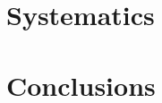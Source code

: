 \begin{refsection}
\section{Systematics}
\label{muEDM:systematics}


\cite{muEDM:Semertzidis:2001} \cite{muEDM:g-2:2008} \cite{muEDM:Adelmann:2010} \cite{muEDM:J-PARC:2011} \cite{muEDM:J-PARC:2016} \cite{muEDM:PSI:2021} \cite{muEDM:PSI:Mikio:2022} \cite{muEDM:PSI:Kim:2022}

\section{Conclusions}

\printbibliography[title=Bibliography on muEDM]
\end{refsection}
